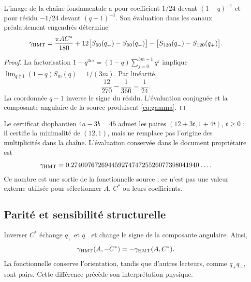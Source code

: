 \begin{theorem}
L'image de la chaîne fondamentale a pour coefficient $1/24$
devant $(1-q)^{-1}$ et pour résidu $-1/24$ devant $(q-1)^{-1}$.
Son évaluation dans les canaux préalablement engendrés détermine
\begin{equation}
\gamma_{\HMT}=
\frac{\pi AC^*}{180}
+12\bigl[S_{90}(q_-)-S_{90}(q_+)\bigr]
-\bigl[S_{120}(q_-)-S_{120}(q_+)\bigr].
\label{eq:gamma}
\end{equation}
\end{theorem}
\begin{proof}
La factorisation $1-q^{3m}=(1-q)\sum_{j=0}^{3m-1}q^j$ implique
$\lim_{q\uparrow1}(1-q)S_m(q)=1/(3m)$. Par linéarité,
\[
\frac{12}{270}-\frac1{360}=\frac1{24}.
\]
La coordonnée $q-1$ inverse le signe du résidu.
L'évaluation conjuguée et la composante angulaire de la source
produisent \eqref{eq:gamma}.
\end{proof}

Le certificat diophantien $4a-3b=45$ admet les paires
$(12+3t,1+4t)$, $t\ge0$ ; il certifie la minimalité de $(12,1)$,
mais ne remplace pas l’origine des multiplicités dans la chaîne.
L’évaluation conservée dans le document propriétaire est
\[
\gamma_{\mathrm{HMT}}
=0.27400767269445927474725526077398041940\ldots.
\]
Ce nombre est une sortie de la fonctionnelle source ; ce n'est pas une valeur externe
utilisée pour sélectionner $A$, $C^*$ ou leurs coefficients.

\subsection{Parité et sensibilité structurelle}
Inverser $C^*$ échange $q_+$ et $q_-$ et change le signe
de la composante angulaire. Ainsi,
\[
\gamma_{\mathrm{HMT}}(A,-C^*)=-\gamma_{\mathrm{HMT}}(A,C^*).
\]
La fonctionnelle conserve l'orientation, tandis que d'autres lecteurs,
comme $q_+q_-$, sont pairs. Cette différence précède son interprétation physique.
